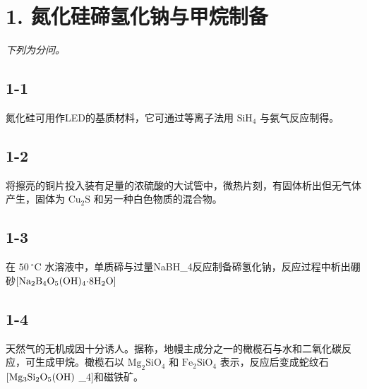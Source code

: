 \section*{1. 氮化硅碲氢化钠与甲烷制备}
\textit{下列为分问。}

\subsection*{1-1}
氮化硅可⽤作LED的基质材料，它可通过等离⼦法⽤ $\mathrm { S i H _ { 4 } }$ 与氨⽓反应制得。

\subsection*{1-2}
将擦亮的铜⽚投⼊装有⾜量的浓硫酸的⼤试管中，微热⽚刻，有固体析出但⽆⽓体产⽣，固体为 $\mathrm { { C u _ { 2 } S } }$ 和另⼀种⽩⾊物质的混合物。

\subsection*{1-3}
在 $5 0 ~ ^ { \circ } \mathrm { C }$ ⽔溶液中，单质碲与过量NaBH_{4}反应制备碲氢化钠，反应过程中析出硼砂$\mathrm { \small { [ N a _ { 2 } B _ { 4 } O _ { 5 } ( O H ) _ { 4 } { \cdot } 8 H _ { 2 } O ] } }$

\subsection*{1-4}
天然⽓的⽆机成因⼗分诱⼈。据称，地幔主成分之⼀的橄榄⽯与⽔和⼆氧化碳反应，可⽣成甲烷。橄榄⽯以 $\mathrm { M g } _ { 2 } \mathrm { S i O } _ { 4 }$ 和 $\mathrm { F e _ { 2 } S i O _ { 4 } }$ 表⽰，反应后变成蛇纹⽯ $\mathrm { \small { [ M g _ { 3 } S i _ { 2 } O _ { 5 } ( O H ) } }$ _{4}]和磁铁矿。
